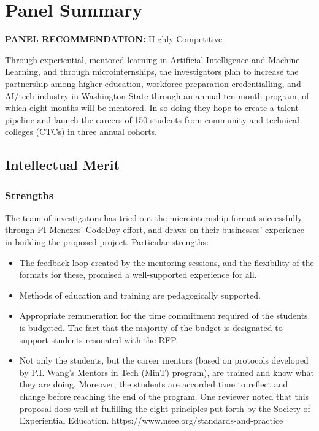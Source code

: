 \section{Panel Summary}

\textbf{PANEL RECOMMENDATION:} Highly Competitive

Through experiential, mentored learning in Artificial Intelligence and Machine Learning, and through microinternships, the investigators plan to increase the partnership among higher education, workforce preparation credentialling, and AI/tech industry in Washington State through an annual ten-month program, of which eight months will be mentored. In so doing they hope to create a talent pipeline and launch the careers of 150 students from community and technical colleges (CTCs) in three annual cohorts.

\subsection{Intellectual Merit}

\subsubsection{Strengths}

The team of investigators has tried out the microinternship format successfully through PI Menezes’ CodeDay effort, and draws on their businesses’ experience in building the proposed project. Particular strengths:

\begin{itemize}
\item The feedback loop created by the mentoring sessions, and the flexibility of the formats for these, promised a well-supported experience for all.
\item Methods of education and training are pedagogically supported.
\item Appropriate remuneration for the time commitment required of the students is budgeted. The fact that the majority of the budget is designated to support students resonated with the RFP.
\item Not only the students, but the career mentors (based on protocols developed by P.I. Wang’s Mentors in Tech (MinT) program), are trained and know what they are doing. Moreover, the students are accorded time to reflect and change before reaching the end of the program. One reviewer noted that this proposal does well at fulfilling the eight principles put forth by the Society of Experiential Education. https://www.nsee.org/standards-and-practice
\end{itemize}

